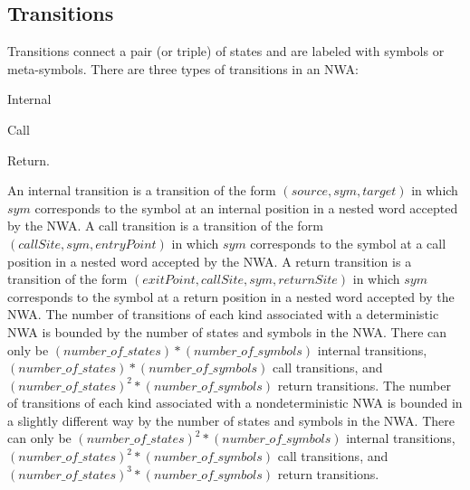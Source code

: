 \documentclass{llncs}
\begin{document}
\subsection{Transitions}
\label{Se:Transitions}

Transitions connect a pair (or triple) of states and are labeled with symbols or meta-symbols.  There are three types of transitions in an NWA: \begin{inparaenum} \item Internal \item Call \item Return. \end{inparaenum}  An internal transition is a transition of the form $(source, sym, target)$ in which $sym$ corresponds to the symbol at an internal position in a nested word accepted by the NWA.  A call transition is a transition of the form $(callSite, sym, entryPoint)$ in which $sym$ corresponds to the symbol at a call position in a nested word accepted by the NWA.  A return transition is a transition of the form $(exitPoint, callSite, sym, returnSite)$ in which $sym$ corresponds to the symbol at a return position in a nested word accepted by the NWA.  The number of transitions of each kind associated with a deterministic NWA is bounded by the number of states and symbols in the NWA.  There can only be $(number\_of\_states)*(number\_of\_symbols)$ internal transitions, $(number\_of\_states)*(number\_of\_symbols)$ call transitions, and $(number\_of\_states)^2*(number\_of\_symbols)$ return transitions.  The number of transitions of each kind associated with a nondeterministic NWA is bounded in a slightly different way by the number of states and symbols in the NWA.  There can only be $(number\_of\_states)^2*(number\_of\_symbols)$ internal transitions, $(number\_of\_states)^2*(number\_of\_symbols)$ call transitions, and $(number\_of\_states)^3*(number\_of\_symbols)$ return transitions.
\end{document}

